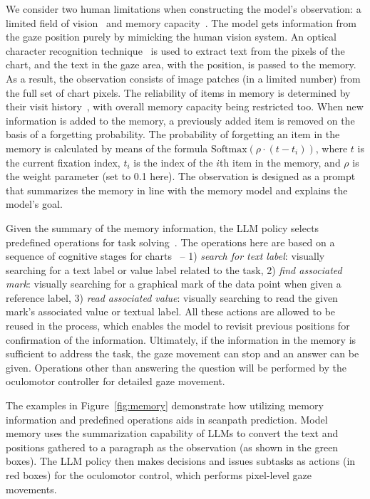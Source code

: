 We consider two human limitations when constructing the model's observation: a limited field of vision~\cite{duchowski2018gaze} and memory capacity~\cite{loftus2019human}. 
The model gets information from the gaze position purely by mimicking the human vision system. 
An optical character recognition technique~\cite{singh2010optical} is used to extract text from the pixels of the chart, and the text in the gaze area, with the position, is passed to the memory.
As a result, the observation consists of image patches (in a limited number) from the full set of chart pixels. The reliability of items in memory is determined by their visit history~\cite{li2023modeling}, with overall memory capacity being restricted too. When new information is added to the memory, a previously added item is removed on the basis of a forgetting probability. The probability of forgetting an item in the memory is calculated by means of the formula $\text{Softmax}(\rho \cdot (t-t_i)) $, where $t$ is the current fixation index, $t_i$ is the index of the $i$th item in the memory, and $\rho$ is the weight parameter (set to 0.1 here). The observation is designed as a prompt that summarizes the memory in line with the memory model and explains the model's goal. 

Given the summary of the memory information, the LLM policy selects predefined operations for task solving~\cite{brohan2023can, liang2023code}. The operations here are based on a sequence of cognitive stages for charts~\cite{goldberg2011eye} -- 1) \textit{search for text label}: visually searching for a text label or value label related to the task, 2) \textit{find associated mark}: visually searching for a graphical mark of the data point when given a reference label, 3) \textit{read associated value}: visually searching to read the given mark's associated value or textual label.
All these actions are allowed to be reused in the process, which enables the model to revisit previous positions for confirmation of the information.
Ultimately, if the information in the memory is sufficient to address the task, the gaze movement can stop and an answer can be given. Operations other than answering the question will be performed by the oculomotor controller for detailed gaze movement. 

The examples in Figure~\ref{fig:memory} demonstrate how utilizing memory information and predefined operations aids in scanpath prediction. Model memory uses the summarization capability of LLMs to convert the text and positions gathered to a paragraph as the observation (as shown in the green boxes). The LLM policy then makes decisions and issues subtasks as actions (in red boxes) for the oculomotor control, which performs pixel-level gaze movements.


